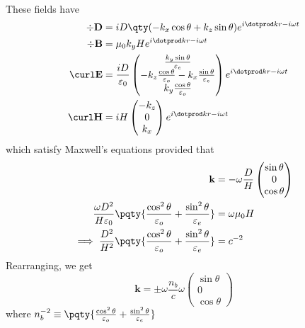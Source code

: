 \documentclass[12pt]{extarticle}
\renewcommand{\bf}{\mathbf}
\begin{document}
\begin{outline}[enumerate]
\begin{align*}
        \end{align*}
        These fields have
        \begin{align*}
            \div \bf D &= i D \qty( - k_x\cos\theta + k_z\sin\theta ) e^{i\dotprod kr - i\omega t}\\
            \div \bf B &= \mu_0 k_y H e^{i\dotprod kr - i\omega t}\\
            \curl \bf E &=  \frac{iD}{\varepsilon_0} \begin{pmatrix} \frac{k_y\sin\theta }{\varepsilon_e}\\- k_z \frac{\cos\theta }{\varepsilon_o} - k_x \frac{\sin\theta }{\varepsilon_e}\\k_y \frac{\cos\theta }{\varepsilon_o}\end{pmatrix} e^{i\dotprod kr - i\omega t}\\
            \curl \bf H &= iH\begin{pmatrix} - k_z \\0\\k_x \end{pmatrix}e^{i\dotprod kr - i\omega t} 
        \end{align*}
        which satisfy Maxwell's equations provided that
        \begin{align*}
            \bf k &=  - \omega \frac{D}{H}\begin{pmatrix} \sin\theta \\0\\ \cos\theta  \end{pmatrix} \\
            \frac{\omega D^2}{H\varepsilon_0}\pqty{\frac{\cos^2\theta}{\varepsilon_o} + \frac{\sin^2 \theta }{\varepsilon_e}} &= \omega \mu_0 H\\
            \implies \frac{D^2}{H^2}\pqty{\frac{\cos^2\theta}{\varepsilon_o} + \frac{\sin^2 \theta }{\varepsilon_e}} &= c^{-2}
        \end{align*}
        Rearranging, we get \[
            \bf k = \pm \omega \frac{n_b}{c}\omega \begin{pmatrix} \sin\theta \\0\\ \cos\theta  \end{pmatrix} 
        \]
        where \(n_b^{-2} \equiv \pqty{\frac{\cos^2\theta }{\varepsilon_o} + \frac{\sin^2\theta }{\varepsilon_e}}\)
        \begin{center}
            \def\svgwidth{300pt}
        \end{center}

\end{outline}
\end{document}
